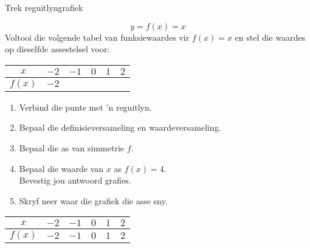 \begin{wex}{Trek reguitlyngrafiek}
{
\begin{equation*}
 y = f(x) = x
\end{equation*}
Voltooi die volgende tabel van funksiewaardes vir $f(x)=x$ en stel die waardes op dieselfde assestelsel voor:
\\
\begin{center}
\begin{tabular}{|c|c|c|c|c|c|}
\hline
  $x$ &  $-2$ & $-1$ & $0$ & $1$ & $2$ 
\\ \hline
 $f(x)$& $-2$ & \phantom{$-2$} & \phantom{$-2$} & \phantom{$-2$} & \phantom{$-2$}
\\ \hline
\end{tabular}
\end{center}
\vspace{10pt}
\begin{enumerate}[noitemsep, label=\textbf{\arabic*}. ] 
 \item Verbind die punte met 'n reguitlyn.
\item Bepaal die definisieversameling en waardeversameling.
\item Bepaal die as van simmetrie $f$.
\item Bepaal die waarde van $x$ as $f(x) = 4$. \\Bevestig jou antwoord grafies.
\item Skryf neer waar die grafiek die asse sny.

\end{enumerate}
}
{

\begin{center}
\begin{tabular}{|c|c|c|c|c|c|}
\hline
  $x$ &  $-2$ & $-1$ & $0$ & $1$ & $2$ 
\\ \hline
 $f(x)$& $-2$ & $-1$ & $0$ & $1$ & $2$ 
\\ \hline
\end{tabular}
\end{center}

}
\end{wex}
